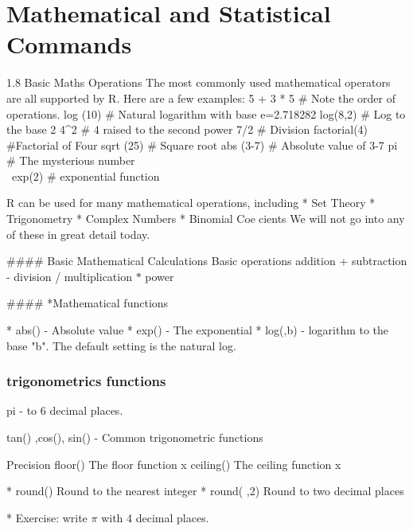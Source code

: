 \documentclass[a4paper,12pt]{article}
\begin{document}
\tableofcontents
\section{Mathematical and Statistical Commands}
1.8 Basic Maths Operations
The most commonly used mathematical operators are all supported by R. Here are a few
examples:
5 + 3 * 5 # Note the order of operations.
log (10) # Natural logarithm with base e=2.718282
log(8,2) # Log to the base 2
4^2 # 4 raised to the second power
7/2 # Division
factorial(4) #Factorial of Four
sqrt (25) # Square root
abs (3-7) # Absolute value of 3-7
pi # The mysterious number \\\
exp(2) # exponential function

R can be used for many mathematical operations, including
* Set Theory
* Trigonometry
* Complex Numbers
* Binomial Coecients
We will not go into any of these in great detail today.

#### {Basic Mathematical Calculations}
Basic operations
addition  +      
subtraction    	-
division   /     
multiplication   $\ast$
power     


#### *{Mathematical functions}
\begin{itemize}
* abs()       - Absolute value 
* exp()	   - The exponential
* log(,b)     - logarithm to the base "b". The default setting is the natural log.
\end{itemize}
\subsubsection*{trigonometrics functions}

pi            -  to 6 decimal places.

tan() ,cos(), sin()   - Common trigonometric functions

 
 Precision
 floor() 	  The floor function 		x
 ceiling()    The ceiling function       x

\begin{itemize} 
* round()      Round to the nearest integer
* round( ,2)  Round to two decimal places
\end{itemize} 
 
\begin{itemize}
* Exercise:  write $\pi$   with 4 decimal places.  
\end{itemize}
\end{document}
